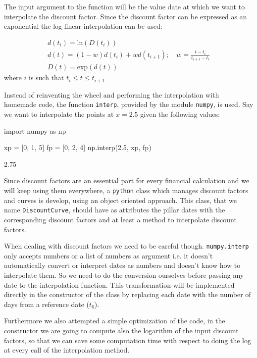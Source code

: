 The input argument to the function will be the value date at which we want to interpolate the discount factor. Since the discount factor can be expressed as an exponential the log-linear interpolation can be used:

\begin{equation}
\begin{gathered}
d(t_i)=\mathrm{ln}(D(t_i))\\
d(t) = (1-w)d(t_i) + wd(t_{i+1});\quad w=\frac{t-t_i}{t_{i+1}-t_i}\\
D(t) = \mathrm{exp}(d(t))
\end{gathered}
\end{equation}
where \(i\) is such that \(t_i \le t \le t_{i+1}\)

Instead of reinventing the wheel and performing the interpolation with homemade code, 
the function \texttt{interp}, provided by the module \texttt{numpy}, is used. 
Say we want to interpolate the points at $x = 2.5$ given the following values:

\begin{ipython}
import numpy as np

xp = [0, 1, 5]
fp = [0, 2, 4]
np.interp(2.5, xp, fp)
\end{ipython}
\begin{ioutput}
2.75
\end{ioutput}

Since discount factors are an essential part for every financial calculation and we will keep using them everywhere, a \texttt{python} class which manages discount factors and curves is develop, using an object oriented approach.
This class, that we name \texttt{DiscountCurve}, should have as attributes the pillar dates with the corresponding discount factors and at least a method to interpolate discount factors.

When dealing with discount factors we need to be careful though. \texttt{numpy.interp} only accepts numbers or a list of numbers as argument i.e. it doesn't automatically convert or interpret dates as numbers and doesn't know how to interpolate them. So we need to do the conversion ourselves before passing any date to the interpolation function. This transformation will be implemented directly in the constructor of the class by replacing each date with the number of days from a reference date ($t_0$).

Furthermore we also attempted a simple optimization of the code, in the constructor we are going to compute also the logarithm of the input discount factors, so that we can save some computation time with respect to doing the log at every call of the interpolation method. 

